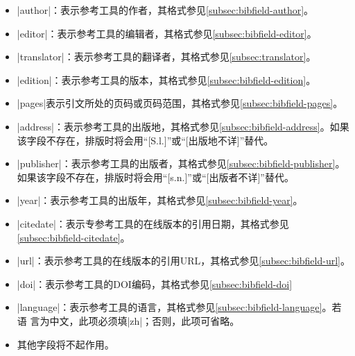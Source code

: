 \begin{itemize}
\item |author|：表示参考工具的作者，其格式参见\ref{subsec:bibfield-author}。
\item |editor|：表示参考工具的编辑者，其格式参见\ref{subsec:bibfield-editor}。
\item |translator|：表示参考工具的翻译者，其格式参见\ref{subsec:translator}。
\item |edition|：表示参考工具的版本，其格式参见\ref{subsec:bibfield-edition}。
\item |pages|表示引文所处的页码或页码范围，其格式参见\ref{subsec:bibfield-pages}。
\item |address|：表示参考工具的出版地，其格式参见\ref{subsec:bibfield-address}。如果
  该字段不存在，{\BibTeX}排版时将会用``[S.l.]''或``[出版地不详]''替代。
\item |publisher|：表示参考工具的出版者，其格式参见\ref{subsec:bibfield-publisher}。
  如果该字段不存在，{\BibTeX}排版时将会用``[s.n.]''或``[出版者不详]''替代。
\item |year|：表示参考工具的出版年，其格式参见\ref{subsec:bibfield-year}。
\item |citedate|：表示专参考工具的在线版本的引用日期，其格式参见\ref{subsec:bibfield-citedate}。
\item |url|：表示参考工具的在线版本的引用URL，其格式参见\ref{subsec:bibfield-url}。
\item |doi|：表示参考工具的DOI编码，其格式参见\ref{subsec:bibfield-doi}
\item |language|：表示参考工具的语言，其格式参见\ref{subsec:bibfield-language}。若语
  言为中文，此项必须填|zh|；否则，此项可省略。
\item 其他字段将不起作用。
\end{itemize}

